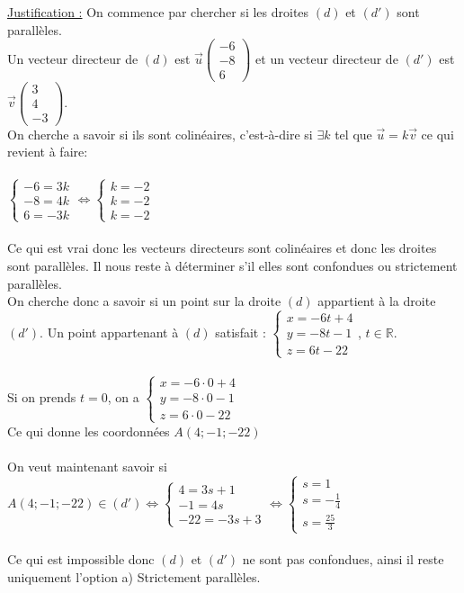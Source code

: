 \documentclass[a4paper, 12pt]{article}
\begin{document}
\noindent
\underline{Justification :}
On commence par chercher si les droites $(d)$ et $(d')$ sont parallèles. 
\\
Un vecteur directeur de $(d)$ est $\vec{u} \begin{pmatrix} -6 \\ -8 \\ 6 \end{pmatrix}$ et un vecteur directeur de $(d')$ est $\vec{v} \begin{pmatrix} 3 \\ 4 \\ -3 \end{pmatrix}$.
\\
On cherche a savoir si ils sont colinéaires, c'est-à-dire si $\exists k$ tel que $ \vec{u} = k\vec{v}$ ce qui revient à faire:
\\ \\
$\begin{cases} -6 = 3k \\ -8 = 4k \\ 6 = -3k \end{cases} \iff \begin{cases} k = -2 \\ k = -2 \\ k = -2 \end{cases}$
\\ \\
Ce qui est vrai donc les vecteurs directeurs sont colinéaires et donc les droites sont parallèles. Il nous reste à déterminer s'il elles sont confondues ou strictement parallèles.
\\
On cherche donc a savoir si un point sur la droite $(d)$ appartient à la droite $(d')$. Un point appartenant à $(d)$ satisfait : 
$ \begin{cases} x = -6t + 4 \\ y = -8t - 1 \\ z = 6t - 22 \end{cases}$, $t \in \mathds{R}$. 
\\ \\
Si on prends $t = 0$, on a $\begin{cases} x = -6 \cdot 0 + 4 \\ y = -8 \cdot 0 - 1 \\ z = 6 \cdot 0 -22 \end{cases}$ \\
Ce qui donne les coordonnées $A(4; -1; -22)$ 
\\ \\
On veut maintenant savoir si $A(4; -1; -22) \in (d') \iff \begin{cases} 4 = 3s + 1 \\ -1 = 4s \\ -22 = -3s + 3 \end{cases} \iff \begin{cases} s = 1 \\ s = -\frac{1}{4} \\ s = \frac{25}{3} \end{cases}$  
\\ \\ 
Ce qui est impossible donc $(d)$ et $(d')$ ne sont pas confondues, ainsi il reste uniquement l'option a) Strictement parallèles.
\end{document}
